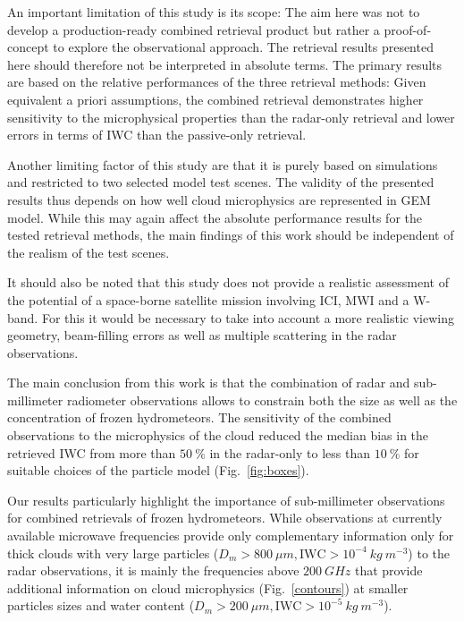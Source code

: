 \documentclass[journal abbreviation, manuscript]{copernicus}
\begin{document}
An important limitation of this study is its scope: The aim here was not to develop
a production-ready combined retrieval product but rather a proof-of-concept to
explore the observational approach. The retrieval results presented here should
therefore not be interpreted in absolute terms. The primary results are based on
the relative performances of the three retrieval methods: Given equivalent a
priori assumptions, the combined retrieval demonstrates higher sensitivity to
the microphysical properties than the radar-only retrieval and lower errors
in terms of IWC than the passive-only retrieval.

Another limiting factor of this study are that it is purely based on simulations
and restricted to two selected model test scenes. The validity of the presented
results thus depends on how well cloud microphysics are represented in GEM
model. While this may again affect the absolute performance results for the
tested retrieval methods, the main findings of this work should be independent
of the realism of the test scenes.

It should also be noted that this study does not provide a realistic assessment
of the potential of a space-borne satellite mission involving ICI, MWI and a
W-band. For this it would be necessary to take into account a more realistic
viewing geometry, beam-filling errors as well as multiple scattering in
the radar observations.

\conclusions  %
\label{sec:conclusions}

The main conclusion from this work is that the combination of radar and
sub-millimeter radiometer observations allows to constrain both the size
as well as the concentration of frozen hydrometeors. The sensitivity of
the combined observations to the microphysics of the cloud reduced the
median bias in the retrieved IWC from more than $50\ \%$ in the radar-only
to less than $10\ \%$ for suitable choices of the particle model (Fig.~\ref{fig:boxes}).

Our results particularly highlight the importance of sub-millimeter observations
for combined retrievals of frozen hydrometeors. While observations at currently
available microwave frequencies provide only complementary information only for
thick clouds with very large particles ($D_m > 800\ \unit{\mu m}, \text{IWC} >
10^{-4}\ \unit{kg\ m^{-3}}$) to the radar observations, it is mainly the
frequencies above $200\ \unit{GHz}$ that provide additional information on cloud
microphysics (Fig.~\ref{contours}) at smaller particles sizes and water content
($D_m > 200\ \unit{\mu m}, \text{IWC} > 10^{-5}\ \unit{kg\ m^{-3}}$).
\end{document}
